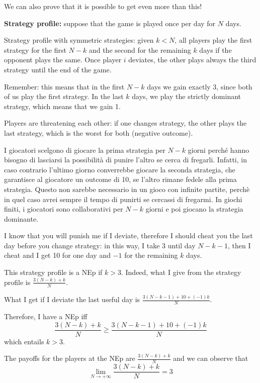 \noindent We can also prove that it is possible to get even more than this!

\bigskip
\noindent \textbf{Strategy profile:} suppose that the game is played once per day for $N$ days.

\noindent Strategy profile with symmetric strategies: given $k < N$, all players play the first strategy for the first $N-k$ and the second for the remaining $k$ days if the opponent plays the same. Once player $i$ deviates, the other plays always the third strategy until the end of the game.

\bigskip
\noindent Remember: this means that in the first $N-k$ days we gain exactly 
3, since both of us play the first strategy. In the last $k$ days, we play the 
strictly dominant strategy, which means that we gain 1.

\noindent Players are threatening each other: if one changes strategy, the other 
plays the last strategy, which is the worst for both (negative outcome).

\noindent I giocatori scelgono di giocare la prima strategia per $N-k$ giorni perché hanno bisogno di lasciarsi la possibilità di punire l'altro se cerca di 
fregarli. Infatti, in caso contrario l'ultimo giorno converrebbe giocare la 
seconda strategia, che garantisce al giocatore un outcome di 10, se l'altro 
rimane fedele alla prima strategia. Questo non sarebbe necessario in un gioco 
con infinite partite, perchè in quel caso avrei sempre il tempo di punirti se 
cercassi di fregarmi. In giochi finiti, i giocatori sono collaborativi per 
$N-k$ giorni e poi giocano la strategia dominante.

\bigskip
\noindent I know that you will punish me if I deviate, therefore I should 
cheat you the last day before you change strategy: in this way, I take 3 
until day $N-k-1$, then I cheat and I get 10 for one day and $-1$ for the 
remaining $k$ days.

\bigskip
\noindent This strategy profile is a NEp if $k > 3$. Indeed, what I give from the strategy profile is
$\frac{3(N-k) + k}{N}$.

\noindent What I get if I deviate the last useful day is $\frac{3(N-k-1) + 10 + (-1)k}{N}$.

\noindent Therefore, I have a NEp iff
\[
	\frac{3(N-k) + k}{N} \geq \frac{3(N-k-1) + 10 + (-1)k}{N} 
\]
which entails $k > 3$.

\bigskip
\noindent The payoffs for the players at the NEp are $\frac{3(N-k) + k}{N}$ and we can observe that
\[
	\lim\limits_{N \rightarrow + \infty}\frac{3(N-k) + k}{N} = 3
\]

